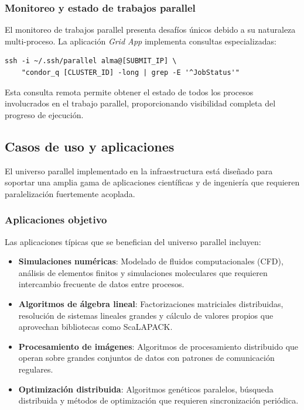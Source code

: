 \subsubsection{Monitoreo y estado de trabajos parallel}
\noindent

El monitoreo de trabajos parallel presenta desafíos únicos debido a su naturaleza multi-proceso. La aplicación \textit{Grid App} implementa consultas especializadas:

\begin{verbatim}
ssh -i ~/.ssh/parallel alma@[SUBMIT_IP] \
    "condor_q [CLUSTER_ID] -long | grep -E '^JobStatus'"
\end{verbatim}

Esta consulta remota permite obtener el estado de todos los procesos involucrados en el trabajo parallel, proporcionando visibilidad completa del progreso de ejecución.

\subsection{Casos de uso y aplicaciones}
\noindent

El universo parallel implementado en la infraestructura \GRID está diseñado para soportar una amplia gama de aplicaciones científicas y de ingeniería que requieren paralelización fuertemente acoplada.

\subsubsection{Aplicaciones objetivo}
\noindent

Las aplicaciones típicas que se benefician del universo parallel incluyen:

\begin{itemize}
	\item \textbf{Simulaciones numéricas}: Modelado de fluidos computacionales (CFD), análisis de elementos finitos y simulaciones moleculares que requieren intercambio frecuente de datos entre procesos.

	\item \textbf{Algoritmos de álgebra lineal}: Factorizaciones matriciales distribuidas, resolución de sistemas lineales grandes y cálculo de valores propios que aprovechan bibliotecas como ScaLAPACK\@.

	\item \textbf{Procesamiento de imágenes}: Algoritmos de procesamiento distribuido que operan sobre grandes conjuntos de datos con patrones de comunicación regulares.

	\item \textbf{Optimización distribuida}: Algoritmos genéticos paralelos, búsqueda distribuida y métodos de optimización que requieren sincronización periódica.
\end{itemize}

